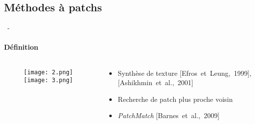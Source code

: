 \documentclass[aspectratio=169, 22pt]{beamer}
\begin{document}
\subsection{Méthodes à patchs}
\begin{frame}{\secname~- \subsecname}
  \framesubtitle{Définition}
  \begin{columns}
    \begin{column}{0.6\linewidth}
      \begin{figure}
        \centering
        \texttt{[image: 2.png]}
        \texttt{[image: 3.png]}
      \end{figure}
    \end{column}
    
    \begin{column}{0.4\linewidth}
      \begin{itemize}
      \item Synthèse de texture [Efros et Leung, 1999], [Ashikhmin et al., 2001]
        \vspace{1em}
      \item Recherche de patch plus proche voisin
      \item \emph{PatchMatch} [Barnes et al., 2009]
      \end{itemize}
      



\end{column}
\end{columns}
\end{frame}
\end{document}
